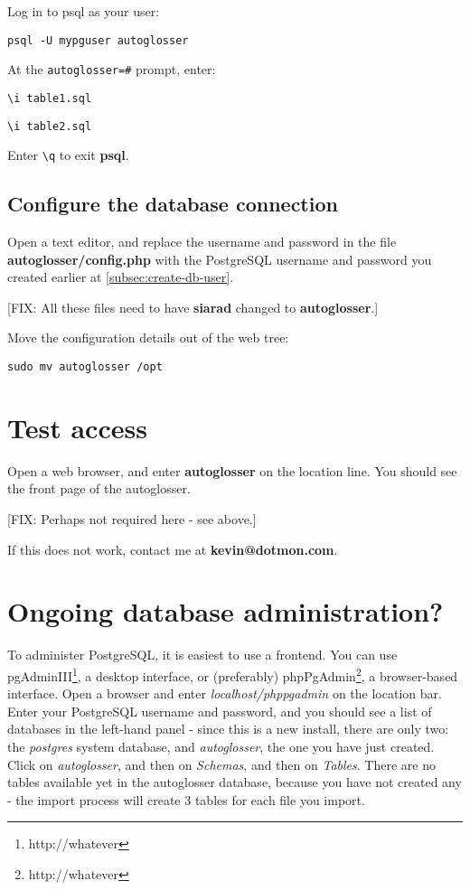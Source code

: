 \documentclass[a4paper,10pt]{article}
\begin{document}
{Log in to psql as your user:

\texttt{psql -U mypguser autoglosser}

At the \verb|autoglosser=#| prompt, enter:

\verb|\i table1.sql|

\verb|\i table2.sql|

Enter \verb|\q| to exit \textbf{psql}.

\subsection{Configure the database connection}

Open a text editor, and replace the username and password in the file \textbf{autoglosser/config.php} with the PostgreSQL username and password you created earlier at \ref{subsec:create-db-user}.

[FIX: All these files need to have \textbf{siarad} changed to \textbf{autoglosser}.]

Move the configuration details out of the web tree:

\texttt{sudo mv autoglosser /opt}

\section{Test access}

Open a web browser, and enter \textbf{autoglosser} on the location line.  You should see the front page of the autoglosser.

[FIX: Perhaps not required here - see above.]

If this does not work, contact me at \textbf{kevin@dotmon.com}.

\section{Ongoing database administration?}

To administer PostgreSQL, it is easiest to use a frontend.  You can use pgAdminIII\footnote{http://whatever}, a desktop interface, or (preferably) phpPgAdmin\footnote{http://whatever}, a browser-based interface.  Open a browser and enter \textit{localhost/phppgadmin} on the location bar.  Enter your PostgreSQL username and password, and you should see a list of databases in the left-hand panel - since this is a new install, there are only two: the \textit{postgres} system database, and \textit{autoglosser}, the one you have just created.  Click on \textit{autoglosser}, and then on \textit{Schemas}, and then on \textit{Tables}.  There are no tables available yet in the autoglosser database, because you have not created any - the import process will create 3 tables for each file you import. 


}
\end{document}
